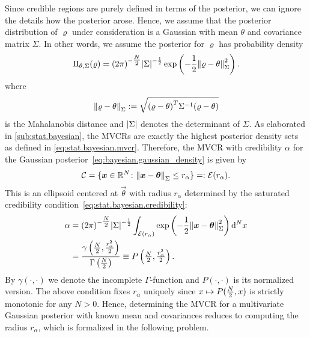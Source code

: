 Since credible regions are purely defined in terms of the posterior, we can ignore the details how the posterior arose.
Hence, we assume that the posterior distribution of $\varrho$ under consideration is a Gaussian with mean $\theta$ and covariance matrix $\Sigma$.
In other words, we assume the posterior for $\varrho$ has probability density
\begin{equation}
  \label{eq:bayesian.gaussian_density}
  \Pi_{\theta,\Sigma}(\varrho) = {(2\pi)}^{-\tfrac{N}{2}} {\vert\Sigma\vert}^{-\frac{1}{2}} \exp\left( -\frac{1}{2} {\Vert\varrho - \theta\Vert}_\Sigma^2 \right).
\end{equation}
where
\begin{equation}
  {\Vert\varrho - \theta\Vert}_\Sigma := \sqrt{{(\varrho - \theta)}^T \Sigma^{-1} (\varrho - \theta)}
\end{equation}
is the Mahalanobis distance and  ${\vert\Sigma\vert}$ denotes the determinant of $\Sigma$.
As elaborated in \cref{sub:stat.bayesian}, the MVCRs are exactly the highest posterior density sets as defined in \cref{eq:stat.bayesian.mvcr}.
Therefore, the MVCR with credibility $\alpha$ for the Gaussian posterior~\eqref{eq:bayesian.gaussian_density} is given by
\begin{equation}
  \label{eq:bayesian.gaussian_cr}
  \mathcal{C} = \{ {\boldsymbol{x}} \in \mathbb{R}^N\colon {\Vert{\boldsymbol{x}} - {\boldsymbol{\theta}}\Vert}_\Sigma \le r_{\alpha} \} =: \mathcal{E}(r_{\alpha}).
\end{equation}
This is an ellipsoid centered at $\vec\theta$ with radius $r_{\alpha}$ determined by the saturated credibility condition~\eqref{eq:stat.bayesian.credibility}:
\begin{equation}
  \label{eq:bayesian.radius}
  \begin{split}
    \alpha
    &= {(2\pi)}^{-\tfrac{N}{2}} {\vert\Sigma\vert}^{-\frac{1}{2}} \int_{\mathcal{E}(r_{\alpha})} \exp\left( -\frac{1}{2} {\Vert{\boldsymbol{x}} - {\boldsymbol{\theta}}\Vert}_\Sigma^2 \right) \mathrm{d}^N x \\
    &= \frac{\gamma\left( \tfrac{N}{2}, \frac{r^2_{\alpha}}{2} \right)}{\Gamma\left( \tfrac{N}{2} \right)}
    \equiv P\left( \tfrac{N}{2}, \tfrac{r^2_{\alpha}}{2} \right).
    \end{split}
\end{equation}
By $\gamma(\cdot,\cdot)$ we denote the incomplete $\Gamma$-function and $P(\cdot,\cdot)$ is its normalized version.
The above condition fixes $r_{\alpha}$ uniquely since $x \mapsto P(\tfrac{N}{2}, x)$ is strictly monotonic for any $N > 0$.
Hence, determining the MVCR for a multivariate Gaussian posterior with known mean and covariances reduces to computing the radius $r_\alpha$, which is formalized in the following problem.
